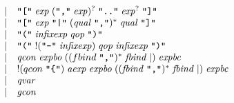 \begin{align*}
\begin{array}{rcl}
    & \mid & \text{\texttt{\textquotedbl[\textquotedbl}}\; \mathit{exp}\; (\text{\texttt{\textquotedbl,\textquotedbl}}\; \mathit{exp})^?\; \text{\texttt{\textquotedbl..\textquotedbl}}\; \mathit{exp}^?\; \text{\texttt{\textquotedbl]\textquotedbl}} \\
    & \mid & \text{\texttt{\textquotedbl[\textquotedbl}}\; \mathit{exp}\; \text{\texttt{\textquotedbl|\textquotedbl}}\; (\mathit{qual}\; \text{\texttt{\textquotedbl,\textquotedbl}})^*\; \mathit{qual}\; \text{\texttt{\textquotedbl]\textquotedbl}} \\
    & \mid & \text{\texttt{\textquotedbl(\textquotedbl}}\; \mathit{infixexp}\; \mathit{qop}\; \text{\texttt{\textquotedbl)\textquotedbl}} \\
    & \mid & \text{\texttt{\textquotedbl(\textquotedbl}}\; ! (\text{\texttt{\textquotedbl-\textquotedbl}}\; \mathit{infixexp})\; \mathit{qop}\; \mathit{infixexp}\; \text{\texttt{\textquotedbl)\textquotedbl}} \\
    & \mid & \mathit{qcon}\; \mathit{expbo}\; (({fbind}\; \text{\texttt{\textquotedbl,\textquotedbl}})^*\; \mathit{fbind} \mid )\; \mathit{expbc} \\
    & \mid & !({qcon}\; \text{\texttt{\textquotedbl\{\textquotedbl}})\; \mathit{aexp}\; \mathit{expbo}\; ((\mathit{fbind}\; \text{\texttt{\textquotedbl,\textquotedbl}})^*\; \mathit{fbind} \mid )\; \mathit{expbc} \\
    & \mid & \mathit{qvar} \\
    & \mid & \mathit{gcon}
  \end{array}
\end{align*}

